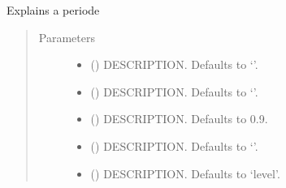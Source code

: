 \documentclass[letterpaper,10pt,english]{sphinxmanual}
\begin{document}
\begin{fulllineitems}
\begin{fulllineitems}
\label{\detokenize{index:modeldekom.totdif.explain_per}}
\pysigstartsignatures
{}
\pysigstopsignatures
\sphinxAtStartPar
Explains a periode
\begin{quote}\begin{description}
\item[{Parameters}] \leavevmode\begin{itemize}
\item {} 
\sphinxAtStartPar
{} (\sphinxstyleliteralemphasis{\sphinxupquote{, }}) \textendash{} DESCRIPTION. Defaults to ‘’.

\item {} 
\sphinxAtStartPar
{} (\sphinxstyleliteralemphasis{\sphinxupquote{, }}) \textendash{} DESCRIPTION. Defaults to ‘’.

\item {} 
\sphinxAtStartPar
{} (\sphinxstyleliteralemphasis{\sphinxupquote{, }}) \textendash{} DESCRIPTION. Defaults to 0.9.

\item {} 
\sphinxAtStartPar
{} (\sphinxstyleliteralemphasis{\sphinxupquote{, }}) \textendash{} DESCRIPTION. Defaults to ‘’.

\item {} 
\sphinxAtStartPar
{} (\sphinxstyleliteralemphasis{\sphinxupquote{, }}) \textendash{} DESCRIPTION. Defaults to ‘level’.


\end{itemize}
\end{description}
\end{quote}
\end{fulllineitems}
\end{fulllineitems}
\end{document}
